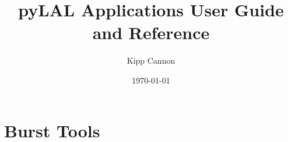 \documentclass{book}
\title{pyLAL Applications User Guide and Reference}
\author{Kipp Cannon}
\date{\today}
\begin{document}
\maketitle
\tableofcontents
\listoftables
\listoffigures

\chapter{Burst Tools}


\end{document}
